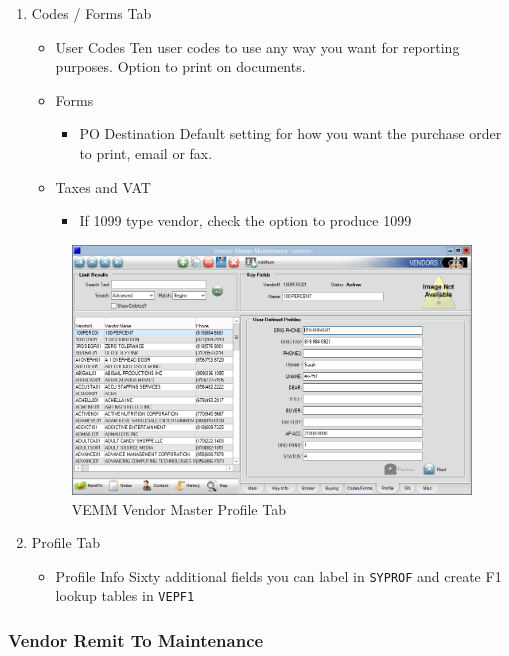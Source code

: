 \begin{enumerate}
	\item Codes / Forms Tab
	\begin{itemize}
		\item User Codes \textemdash Ten user codes to use any way you want for reporting purposes. Option to print on documents.
		\item Forms
		\begin{itemize}
			\item PO Destination \textemdash Default setting for how you want the purchase order to print, email or fax.			
		\end{itemize}
		\item Taxes and VAT
		\begin{itemize}
			\item If 1099 type vendor, check the option to produce 1099
		\end{itemize}
	\end{itemize}
	
	\begin{figure}[H]
		\includegraphics[width=\textwidth]{../img/image71}
		\caption{VEMM Vendor Master Profile Tab}
	\end{figure}
	
	\item Profile Tab
	\begin{itemize}
		\item Profile Info \textemdash Sixty additional fields you can label in \texttt{SYPROF} and create F1 lookup tables in \texttt{VEPF1}
	\end{itemize}
\end{enumerate}

\subsubsection{Vendor Remit To Maintenance}

